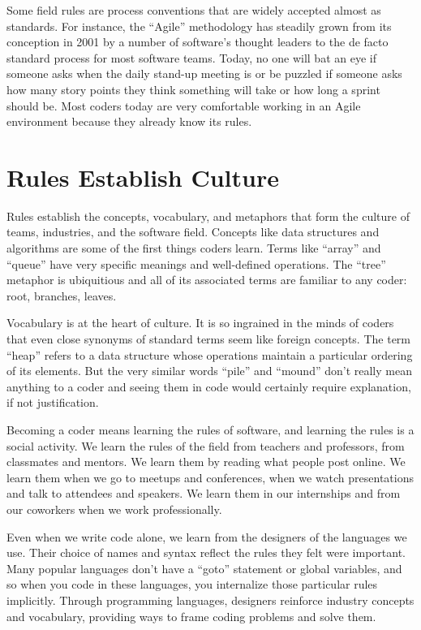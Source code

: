 Some field rules are process conventions that are widely accepted almost as
standards. For instance, the ``Agile'' methodology has steadily grown from its
conception in 2001 by a number of software's thought leaders to the de facto
standard process for most software teams. Today, no one will bat an eye if
someone asks when the daily stand-up meeting is or be puzzled if someone asks
how many story points they think something will take or how long a sprint
should be. Most coders today are very comfortable working in an Agile
environment because they already know its rules.

\section{Rules Establish Culture}

Rules establish the concepts, vocabulary, and metaphors that form the culture of
teams, industries, and the software field. Concepts like data structures and
algorithms are some of the first things coders learn. Terms like ``array'' and
``queue'' have very specific meanings and well-defined operations. The ``tree''
metaphor is ubiquitious and all of its associated terms are familiar to any
coder: root, branches, leaves.

Vocabulary is at the heart of culture. It is so ingrained in the minds of
coders that even close synonyms of standard terms seem like foreign concepts.
The term ``heap'' refers to a data structure whose operations maintain a
particular ordering of its elements. But the very similar words ``pile'' and
``mound'' don't really mean anything to a coder and seeing them in code would
certainly require explanation, if not justification.

Becoming a coder means learning the rules of software, and learning the rules
is a social activity. We learn the rules of the field from teachers and
professors, from classmates and mentors. We learn them by reading what people
post online. We learn them when we go to meetups and conferences, when we watch
presentations and talk to attendees and speakers. We learn them in our
internships and from our coworkers when we work professionally.

Even when we write code alone, we learn from the designers of the languages we
use. Their choice of names and syntax reflect the rules they felt were
important. Many popular languages don't have a ``goto'' statement or global
variables, and so when you code in these languages, you internalize those
particular rules implicitly. Through programming languages, designers reinforce
industry concepts and vocabulary, providing ways to frame coding problems and
solve them.

